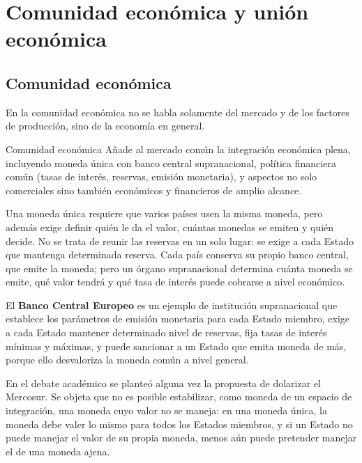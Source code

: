 \documentclass[12pt,oneside]{book}
\renewcommand{\chaptermark}[1]{\markboth{\thechapter.\ #1}{}}
\begin{document}
\chapter{Comunidad económica y unión económica}
\chaptermark{Comunidad y unión económica}

\section{Comunidad económica}

En la comunidad económica no se habla solamente del mercado y de los factores de producción, sino de la economía en general.

\begin{definicion}{Comunidad económica}
Añade al mercado común la integración económica plena, incluyendo moneda única con banco central supranacional, política financiera común (tasas de interés, reservas, emisión monetaria), y aspectos no solo comerciales sino también económicos y financieros de amplio alcance.
\end{definicion}

Una moneda única requiere que varios países usen la misma moneda, pero además exige definir quién le da el valor, cuántas monedas se emiten y quién decide. No se trata de reunir las reservas en un solo lugar: se exige a cada Estado que mantenga determinada reserva. Cada país conserva su propio banco central, que emite la moneda; pero un órgano supranacional determina cuánta moneda se emite, qué valor tendrá y qué tasa de interés puede cobrarse a nivel económico.

\begin{importante}
El \textbf{Banco Central Europeo} es un ejemplo de institución supranacional que establece los parámetros de emisión monetaria para cada Estado miembro, exige a cada Estado mantener determinado nivel de reservas, fija tasas de interés mínimas y máximas, y puede sancionar a un Estado que emita moneda de más, porque ello desvaloriza la moneda común a nivel general.
\end{importante}

En el debate académico se planteó alguna vez la propuesta de dolarizar el Mercosur. Se objeta que no es posible estabilizar, como moneda de un espacio de integración, una moneda cuyo valor no se maneja: en una moneda única, la moneda debe valer lo mismo para todos los Estados miembros, y si un Estado no puede manejar el valor de su propia moneda, menos aún puede pretender manejar el de una moneda ajena.
\end{document}
